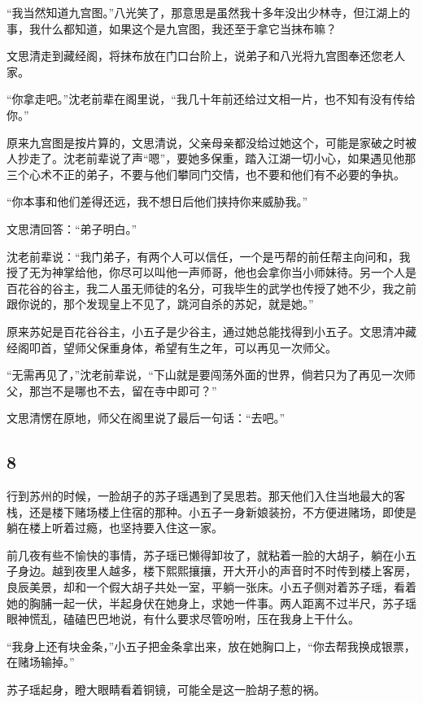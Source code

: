 “我当然知道九宫图。”八光笑了，那意思是虽然我十多年没出少林寺，但江湖上的事，我什么都知道，如果这个是九宫图，我还至于拿它当抹布嘛？

文思清走到藏经阁，将抹布放在门口台阶上，说弟子和八光将九宫图奉还您老人家。

“你拿走吧。”沈老前辈在阁里说，“我几十年前还给过文相一片，也不知有没有传给你。”

原来九宫图是按片算的，文思清说，父亲母亲都没给过她这个，可能是家破之时被人抄走了。沈老前辈说了声“嗯”，要她多保重，踏入江湖一切小心，如果遇见他那三个心术不正的弟子，不要与他们攀同门交情，也不要和他们有不必要的争执。

“你本事和他们差得还远，我不想日后他们挟持你来威胁我。”

文思清回答：“弟子明白。”

沈老前辈说：“我门弟子，有两个人可以信任，一个是丐帮的前任帮主向问和，我授了无为神掌给他，你尽可以叫他一声师哥，他也会拿你当小师妹待。另一个人是百花谷的谷主，我二人虽无师徒的名分，可我毕生的武学也传授了她不少，我之前跟你说的，那个发现皇上不见了，跳河自杀的苏妃，就是她。”

原来苏妃是百花谷谷主，小五子是少谷主，通过她总能找得到小五子。文思清冲藏经阁叩首，望师父保重身体，希望有生之年，可以再见一次师父。

“无需再见了，”沈老前辈说，“下山就是要闯荡外面的世界，倘若只为了再见一次师父，那岂不是哪也不去，留在寺中即可？”

文思清愣在原地，师父在阁里说了最后一句话：“去吧。”
\newline

{\centering\subsection{8}}

行到苏州的时候，一脸胡子的苏子瑶遇到了吴思若。那天他们入住当地最大的客栈，还是楼下赌场楼上住宿的那种。小五子一身新娘装扮，不方便进赌场，即使是躺在楼上听着过瘾，也坚持要入住这一家。

前几夜有些不愉快的事情，苏子瑶已懒得卸妆了，就粘着一脸的大胡子，躺在小五子身边。越到夜里人越多，楼下熙熙攘攘，开大开小的声音时不时传到楼上客房，良辰美景，却和一个假大胡子共处一室，平躺一张床。小五子侧对着苏子瑶，看着她的胸脯一起一伏，半起身伏在她身上，求她一件事。两人距离不过半尺，苏子瑶眼神慌乱，磕磕巴巴地说，有什么要求尽管吩咐，压在我身上干什么。

“我身上还有块金条，”小五子把金条拿出来，放在她胸口上，“你去帮我换成银票，在赌场输掉。”

苏子瑶起身，瞪大眼睛看着铜镜，可能全是这一脸胡子惹的祸。

